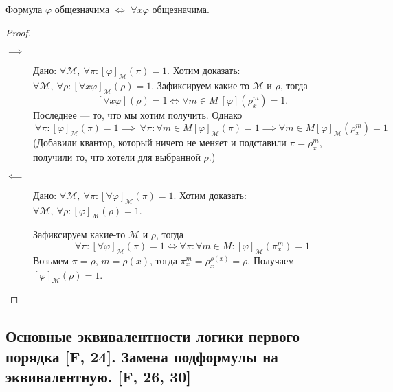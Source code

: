 \documentclass[a4paper, fleqn]{article}
\begin{document}
    \begin{lemma}
        Формула $\varphi$ общезначима $\iff$ $\forall x \varphi$ общезначима.
    \end{lemma}
    
    \begin{proof}~
        \begin{description}
            \item[$\implies$] Дано: $\forall \mathcal{M},~\forall \pi \colon [\varphi]_{\mathcal{M}}(\pi) = 1$.
            Хотим доказать: $\forall \mathcal{M},~\forall \rho \colon [\forall x \varphi]_{\mathcal{M}}(\rho) = 1$.
            Зафиксируем какие-то $\mathcal{M}$ и $\rho$, тогда
            \[
                [\forall x \varphi](\rho) = 1 \iff \forall m \in M~ [\varphi]\left(\rho_{x}^{m}\right) = 1.
            \]
            Последнее --- то, что мы хотим получить. Однако 
            \[
                ~\forall \pi \colon [\varphi]_{\mathcal{M}}(\pi) = 1 \implies
                ~\forall \pi \colon \forall m \in M [\varphi]_{\mathcal{M}}(\pi) = 1 \implies
                \forall m \in M [\varphi]_{\mathcal{M}}(\rho_{x}^{m}) = 1
            \]
            (Добавили квантор, который ничего не меняет и подставили $\pi = \rho_{x}^{m}$, получили
            то, что хотели для выбранной $\rho$.)
            
            \item[$\impliedby$] Дано: $\forall \mathcal{M},~\forall \pi \colon [\forall\varphi]_{\mathcal{M}}(\pi) = 1$.
            Хотим доказать: $\forall \mathcal{M},~\forall \rho \colon [\varphi]_{\mathcal{M}}(\rho) = 1$.

            Зафиксируем какие-то $\mathcal{M}$ и $\rho$, тогда
            \[
                \forall \pi \colon [\forall\varphi]_{\mathcal{M}}(\pi) = 1 \iff
                \forall \pi \colon \forall m \in M \colon [\varphi]_{\mathcal{M}}\left(\pi_{x}^{m}\right) = 1
            \]
            Возьмем $\pi = \rho$, $m = \rho(x)$, тогда $\pi_{x}^{m} = \rho_{x}^{\rho(x)} = \rho$. 
            Получаем $[\varphi]_{\mathcal{M}}(\rho) = 1$.
        \end{description}
    \end{proof}

    \subsection{Основные эквивалентности логики первого порядка [F, 24]. Замена подформулы на эквивалентную. [F, 26, 30]}
\end{document}
